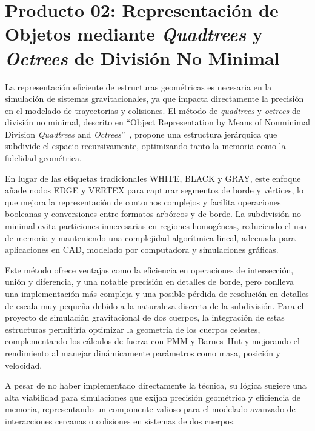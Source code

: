 \section[Representación de Objetos]{Producto 02: Representación de Objetos mediante \textit{Quadtrees} y \textit{Octrees} de División No Minimal}%
\label{sec:state_of_the_art_02}

La representación eficiente de estructuras geométricas es necesaria en la simulación de sistemas gravitacionales, ya que impacta directamente la precisión en el modelado de trayectorias y colisiones. El método de \textit{quadtrees} y \textit{octrees} de división no minimal, descrito en “Object Representation by Means of Nonminimal Division \textit{Quadtrees} and \textit{Octrees}”~\cite{Ayala1985}, propone una estructura jerárquica que subdivide el espacio recursivamente, optimizando tanto la memoria como la fidelidad geométrica.

En lugar de las etiquetas tradicionales \textsc{WHITE}, \textsc{BLACK} y \textsc{GRAY}, este enfoque añade nodos \textsc{EDGE} y \textsc{VERTEX} para capturar segmentos de borde y vértices, lo que mejora la representación de contornos complejos y facilita operaciones booleanas y conversiones entre formatos arbóreos y de borde. La subdivisión no minimal evita particiones innecesarias en regiones homogéneas, reduciendo el uso de memoria y manteniendo una complejidad algorítmica lineal, adecuada para aplicaciones en CAD, modelado por computadora y simulaciones gráficas.

Este método ofrece ventajas como la eficiencia en operaciones de intersección, unión y diferencia, y una notable precisión en detalles de borde, pero conlleva una implementación más compleja y una posible pérdida de resolución en detalles de escala muy pequeña debido a la naturaleza discreta de la subdivisión. Para el proyecto de simulación gravitacional de dos cuerpos, la integración de estas estructuras permitiría optimizar la geometría de los cuerpos celestes, complementando los cálculos de fuerza con FMM y Barnes–Hut y mejorando el rendimiento al manejar dinámicamente parámetros como masa, posición y velocidad.

A pesar de no haber implementado directamente la técnica, su lógica sugiere una alta viabilidad para simulaciones que exijan precisión geométrica y eficiencia de memoria, representando un componente valioso para el modelado avanzado de interacciones cercanas o colisiones en sistemas de dos cuerpos.

